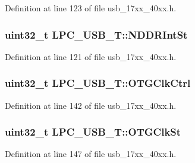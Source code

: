 Definition at line 123 of file usb\+\_\+17xx\+\_\+40xx.\+h.

\subsubsection[{\texorpdfstring{N\+D\+D\+R\+Int\+St}{NDDRIntSt}}]{ uint32\+\_\+t L\+P\+C\+\_\+\+U\+S\+B\+\_\+\+T\+::\+N\+D\+D\+R\+Int\+St}\hypertarget{structLPC__USB__T_a375c36061f5d778987c905a593ab22aa}{}\label{structLPC__USB__T_a375c36061f5d778987c905a593ab22aa}


Definition at line 121 of file usb\+\_\+17xx\+\_\+40xx.\+h.

\subsubsection[{\texorpdfstring{O\+T\+G\+Clk\+Ctrl}{OTGClkCtrl}}]{ uint32\+\_\+t L\+P\+C\+\_\+\+U\+S\+B\+\_\+\+T\+::\+O\+T\+G\+Clk\+Ctrl}\hypertarget{structLPC__USB__T_a913469cc2fd3758b66ad500951e1cb22}{}\label{structLPC__USB__T_a913469cc2fd3758b66ad500951e1cb22}


Definition at line 142 of file usb\+\_\+17xx\+\_\+40xx.\+h.

\subsubsection[{\texorpdfstring{O\+T\+G\+Clk\+St}{OTGClkSt}}]{ uint32\+\_\+t L\+P\+C\+\_\+\+U\+S\+B\+\_\+\+T\+::\+O\+T\+G\+Clk\+St}\hypertarget{structLPC__USB__T_a5027ef8b8861fd12c86417f47ddee71d}{}\label{structLPC__USB__T_a5027ef8b8861fd12c86417f47ddee71d}


Definition at line 147 of file usb\+\_\+17xx\+\_\+40xx.\+h.

